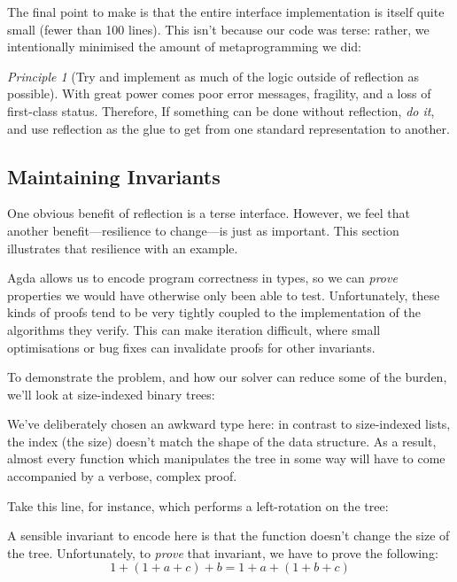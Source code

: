 \documentclass[acmsmall,review,anonymous]{acmart}\settopmatter{printfolios=true,printccs=false,printacmref=false}
\theoremstyle{remark}
\newtheorem{principle}{Principle}
\begin{document}
The final point to make is that the entire interface implementation is itself
quite small (fewer than 100 lines). This isn't because our code was terse:
rather, we intentionally minimised the amount of metaprogramming we did:

\begin{principle}[Try and implement as much of the logic outside of reflection
  as possible] With great power comes poor error messages, fragility, and a loss
  of first-class status. Therefore, If something can be done without reflection,
  \emph{do it}, and use reflection as the glue to get from one standard
  representation to another.
\end{principle}
\subsection{Maintaining Invariants}
One obvious benefit of reflection is a terse interface. However, we feel that
another benefit---resilience to change---is just as important. This section
illustrates that resilience with an example.

Agda allows us to encode program correctness in types, so we can \emph{prove}
properties we would have otherwise only been able to test. Unfortunately, these
kinds of proofs tend to be very tightly coupled to the implementation of the
algorithms they verify. This can make iteration difficult, where small
optimisations or bug fixes can invalidate proofs for other invariants.

To demonstrate the problem, and how our solver can reduce some of the burden,
we'll look at size-indexed binary trees:
\begin{center}
\end{center}
We've deliberately chosen an awkward type here: in contrast to size-indexed
lists, the index (the size) doesn't match the shape of the data structure. As a
result, almost every function which manipulates the tree in some way will have
to come accompanied by a verbose, complex proof.

Take this line, for instance, which performs a left-rotation on the tree:
\begin{center}
\end{center}

A sensible invariant to encode here is that the function doesn't change the size
of the tree. Unfortunately, to \emph{prove} that invariant, we have to prove the
following:
\[1 + (1 + a + c) + b = 1 + a + (1 + b + c)\]
\end{document}
